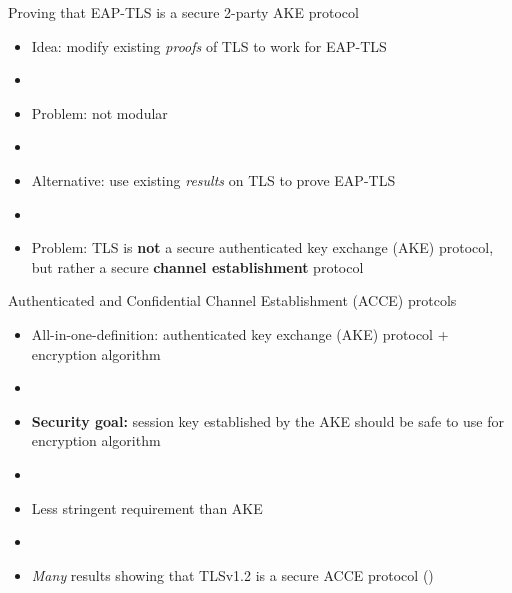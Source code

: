 \documentclass[xcolor={dvipsnames},screen,compress]{beamer}
\begin{document}
\begin{frame}{Proving that EAP-TLS is a secure 2-party AKE protocol}
	
	
	\begin{itemize}
		\item<1-> Idea: modify existing \emph{proofs} of TLS to work for EAP-TLS
		
		\item[] 
		
		\item<2-> Problem: not modular
		
		\item[]
		
		\item<3-> Alternative: use existing \emph{results} on TLS to prove EAP-TLS
		
		\item[]
		
		\item<4-> Problem: TLS is \textbf{not} a secure authenticated key exchange (AKE) protocol,
		but rather a secure \textbf{channel establishment} protocol
		
	\end{itemize}
		
\end{frame}




\begin{frame}{Authenticated and Confidential Channel Establishment (ACCE)  protcols \cite{C:JKSS12}}
	\begin{itemize}
		\item All-in-one-definition: authenticated key exchange (AKE) protocol + encryption algorithm
	
		\item[]
		
		\item \textbf{Security goal:} session key established by the AKE should be safe to use for encryption algorithm
		
		\item[]
			
		\item Less stringent requirement than AKE
		
		\item[]
		
		\item \emph{Many} results showing that TLSv1.2 is a secure ACCE protocol (\cite{C:JKSS12,C:KraPatWee13,EPRINT:KohSchSch13,BrzuskaFSWW:2012:less_is_more,PKC:LSYKS14})
	\end{itemize}	
		
\end{frame}
\end{document}
